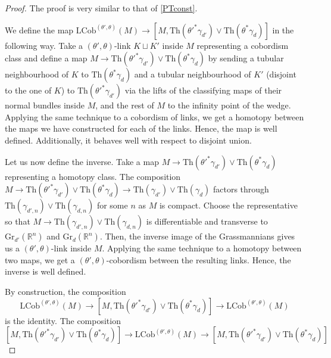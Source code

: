\documentclass[a4paper, 11pt,reqno]{amsart}
\theoremstyle{plain}
\newtheorem{proposition}[theorem]{Proposition}
\theoremstyle{definition}
\newcommand{\Th}{\mathrm{Th}}
\begin{document}
\begin{proof} The proof is very similar to that of \cref{PTconst}.\par
We define the map $\mathrm{LCob}^{(\theta',\theta)}(M)\to\left[M, \Th(\theta'^\ast\gamma_{d'})\vee\Th(\theta^\ast\gamma_{d})\right]$ in the following way. Take a $(\theta',\theta)$-link $K\sqcup K'$ inside $M$ representing a cobordism class and define a map $M\to \Th(\theta'^\ast\gamma_{d'})\vee\Th(\theta^\ast\gamma_{d})$ by sending a tubular neighbourhood of $K$ to $\Th(\theta^\ast\gamma_{d})$ and a tubular neighbourhood of $K'$ (disjoint to the one of $K$) to $\Th(\theta'^\ast\gamma_{d'})$ via the lifts of the classifying maps of their normal bundles inside $M$, and the rest of $M$ to the infinity point of the wedge. Applying the same technique to a cobordism of links, we get a homotopy between the maps we have constructed for each of the links. Hence, the map is well defined. Additionally, it behaves well with respect to disjoint union.\par
Let us now define the inverse. Take a map $M\to\Th(\theta'^\ast\gamma_{d'})\vee\Th(\theta^\ast\gamma_{d})$ representing a homotopy class. The composition $M\to \Th(\theta'^\ast\gamma_{d'})\vee\Th(\theta^\ast\gamma_{d})\to\Th(\gamma_{d'})\vee\Th(\gamma_{d})$ factors through $\Th(\gamma_{d',n})\vee\Th(\gamma_{d,n})$ for some $n$ as $M$ is compact. Choose the representative so that $M\to \Th(\gamma_{d',n})\vee\Th(\gamma_{d,n})$ is differentiable and transverse to $\mathrm{Gr}_{d'}(\mathbb{R}^n)$ and $\mathrm{Gr}_{d}(\mathbb{R}^n)$. Then, the inverse image of the Grassmannians gives us a $(\theta',\theta)$-link inside $M$. Applying the same technique to a homotopy between two maps, we get a $(\theta',\theta)$-cobordism between the resulting links. Hence, the inverse is well defined.\par
By construction, the composition
\[\mathrm{LCob}^{(\theta',\theta)}(M)\to\left[M, \Th(\theta'^\ast\gamma_{d'})\vee\Th(\theta^\ast\gamma_{d})\right]\to\mathrm{LCob}^{(\theta',\theta)}(M)\]
is the identity. The composition
\[\left[M, \Th(\theta'^\ast\gamma_{d'})\vee\Th(\theta^\ast\gamma_{d})\right]\to\mathrm{LCob}^{(\theta',\theta)}(M)\to\left[M, \Th(\theta'^\ast\gamma_{d'})\vee\Th(\theta^\ast\gamma_{d})\right]\]

\end{proof}
\end{document}
